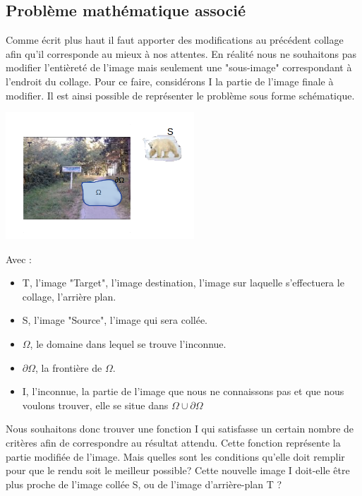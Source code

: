 \subsection{Problème mathématique associé}

Comme écrit plus haut il faut apporter des modifications au précédent collage afin qu'il corresponde au mieux à nos attentes. En réalité nous ne souhaitons pas modifier l'entièreté de l'image mais seulement une "sous-image" correspondant à l'endroit du collage. Pour ce faire, considérons I la partie de l'image finale à modifier. Il est ainsi possible de représenter le problème sous forme schématique. 
\begin{center}
    \includegraphics[width = 200pt]{beamIm/selectedscheme.png}
\end{center}

Avec : 
\begin{itemize}
    \item T,  l'image "Target", l'image destination, l'image sur laquelle s'effectuera le collage, l'arrière plan. 
    \item S, l'image "Source", l'image qui sera collée.
    \item $\Omega$, le domaine dans lequel se trouve l'inconnue.
    \item $\partial \Omega$, la frontière de $\Omega$.
    \item I, l'inconnue, la partie de l'image que nous ne connaissons pas et que nous voulons trouver, elle se situe dans $\Omega \cup \partial \Omega$
\end{itemize}

Nous souhaitons donc trouver une fonction I qui satisfasse un certain nombre de critères afin de correspondre au résultat attendu.  
Cette fonction représente la partie modifiée de l'image. Mais quelles sont les conditions qu'elle doit remplir pour que le rendu soit le meilleur possible? Cette nouvelle image I doit-elle être plus proche de l'image collée S, ou de l'image d'arrière-plan T ? \newline

